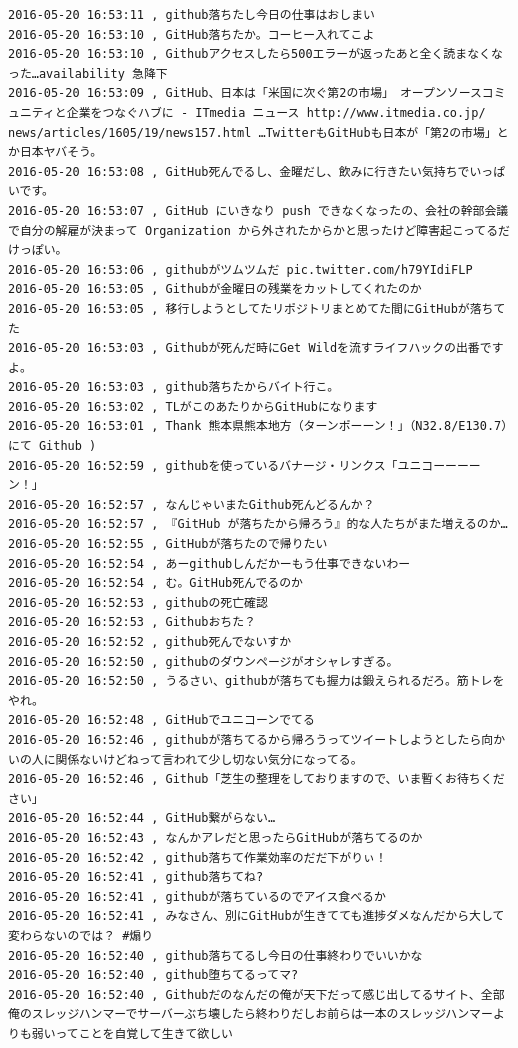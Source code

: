 \begin{verbatim}
2016-05-20 16:53:11 , github落ちたし今日の仕事はおしまい
2016-05-20 16:53:10 , GitHub落ちたか。コーヒー入れてこよ
2016-05-20 16:53:10 , Githubアクセスしたら500エラーが返ったあと全く読まなくなった…availability 急降下
2016-05-20 16:53:09 , GitHub、日本は「米国に次ぐ第2の市場」　オープンソースコミュニティと企業をつなぐハブに - ITmedia ニュース http://www.itmedia.co.jp/
news/articles/1605/19/news157.html …TwitterもGitHubも日本が「第2の市場」とか日本ヤバそう。
2016-05-20 16:53:08 , GitHub死んでるし、金曜だし、飲みに行きたい気持ちでいっぱいです。
2016-05-20 16:53:07 , GitHub にいきなり push できなくなったの、会社の幹部会議で自分の解雇が決まって Organization から外されたからかと思ったけど障害起こってるだけっぽい。
2016-05-20 16:53:06 , githubがツムツムだ pic.twitter.com/h79YIdiFLP
2016-05-20 16:53:05 , Githubが金曜日の残業をカットしてくれたのか
2016-05-20 16:53:05 , 移行しようとしてたリポジトリまとめてた間にGitHubが落ちてた
2016-05-20 16:53:03 , Githubが死んだ時にGet Wildを流すライフハックの出番ですよ。
2016-05-20 16:53:03 , github落ちたからバイト行こ。
2016-05-20 16:53:02 , TLがこのあたりからGitHubになります
2016-05-20 16:53:01 , Thank 熊本県熊本地方（ターンポーーン！」（N32.8/E130.7）にて Github )
2016-05-20 16:52:59 , githubを使っているバナージ・リンクス「ユニコーーーーン！」
2016-05-20 16:52:57 , なんじゃいまたGithub死んどるんか？
2016-05-20 16:52:57 , 『GitHub が落ちたから帰ろう』的な人たちがまた増えるのか…
2016-05-20 16:52:55 , GitHubが落ちたので帰りたい
2016-05-20 16:52:54 , あーgithubしんだかーもう仕事できないわー
2016-05-20 16:52:54 , む。GitHub死んでるのか
2016-05-20 16:52:53 , githubの死亡確認
2016-05-20 16:52:53 , Githubおちた？
2016-05-20 16:52:52 , github死んでないすか
2016-05-20 16:52:50 , githubのダウンページがオシャレすぎる。
2016-05-20 16:52:50 , うるさい、githubが落ちても握力は鍛えられるだろ。筋トレをやれ。
2016-05-20 16:52:48 , GitHubでユニコーンでてる
2016-05-20 16:52:46 , githubが落ちてるから帰ろうってツイートしようとしたら向かいの人に関係ないけどねって言われて少し切ない気分になってる。
2016-05-20 16:52:46 , Github「芝生の整理をしておりますので、いま暫くお待ちください」
2016-05-20 16:52:44 , GitHub繋がらない…
2016-05-20 16:52:43 , なんかアレだと思ったらGitHubが落ちてるのか
2016-05-20 16:52:42 , github落ちて作業効率のだだ下がりぃ！
2016-05-20 16:52:41 , github落ちてね?
2016-05-20 16:52:41 , githubが落ちているのでアイス食べるか
2016-05-20 16:52:41 , みなさん、別にGitHubが生きてても進捗ダメなんだから大して変わらないのでは？ #煽り
2016-05-20 16:52:40 , github落ちてるし今日の仕事終わりでいいかな
2016-05-20 16:52:40 , github堕ちてるってマ?
2016-05-20 16:52:40 , Githubだのなんだの俺が天下だって感じ出してるサイト、全部俺のスレッジハンマーでサーバーぶち壊したら終わりだしお前らは一本のスレッジハンマーよりも弱いってことを自覚して生きて欲しい

\end{verbatim}
